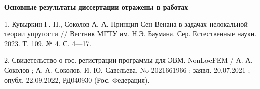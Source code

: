 \textbf{Основные результаты диссертации отражены в работах}

1. Кувыркин Г. Н., Соколов А. А. Принцип Сен-Венана в задачах нело­кальной теории упругости // Вестник МГТУ им. Н.Э. Баумана. Сер. Естественные науки. 2023. Т. 109. № 4. С. 4—17.

2. Свидетельство о гос. регистрации программы для ЭВМ. NonLocFEM / А. А. Соколов ; А. А. Соколов, И. Ю. Савельева. No 2021661966 ; заявл. 20.07.2021 ; опубл. 22.09.2022, РД040930 (Рос. Федерация).

